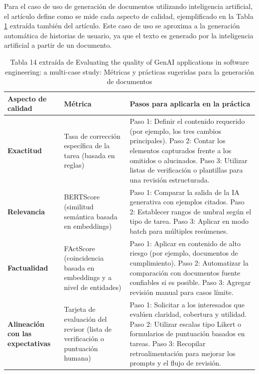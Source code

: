 Para el caso de uso de generación de documentos utilizando inteligencia artificial, el artículo define como se mide cada aspecto de calidad, ejemplificado en la Tabla \ref{table:aritculo-eval2} extraída también del artículo. Este caso de uso se aproxima a la generación automática de historias de usuario, ya que el texto es generado por la inteligencia artificial a partir de un documento.

\begin{longtable}{|p{3cm}| p{4cm} |p{4cm}|}
\caption{Tabla 14 extraída de Evaluating the quality of GenAI applications in software
engineering: a multi-case study: Métricas y prácticas sugeridas para la generación de documentos}
\label{table:aritculo-eval2}\\
\hline
\textbf{Aspecto de calidad} & \textbf{Métrica} & \textbf{Pasos para aplicarla en la práctica} \\
\hline

\textbf{Exactitud} &
Tasa de corrección específica de la tarea (basada en reglas) &
Paso 1: Definir el contenido requerido (por ejemplo, los tres cambios principales). \newline
Paso 2: Contar los elementos capturados frente a los omitidos o alucinados. \newline
Paso 3: Utilizar listas de verificación o plantillas para una revisión estructurada. \\

\hline

\textbf{Relevancia} &
BERTScore (similitud semántica basada en embeddings) &
Paso 1: Comparar la salida de la IA generativa con ejemplos citados. \newline
Paso 2: Establecer rangos de umbral según el tipo de tarea. \newline
Paso 3: Aplicar en modo batch para múltiples resúmenes. \\

\hline

\textbf{Factualidad} &
FActScore (coincidencia basada en embeddings y a nivel de entidades) &
Paso 1: Aplicar en contenido de alto riesgo (por ejemplo, documentos de cumplimiento). \newline
Paso 2: Automatizar la comparación con documentos fuente confiables si es posible. \newline
Paso 3: Agregar revisión manual para casos límite. \\

\hline

\textbf{Alineación con las expectativas} &
Tarjeta de evaluación del revisor (lista de verificación o puntuación humana) &
Paso 1: Solicitar a los interesados que evalúen claridad, cobertura y utilidad. \newline
Paso 2: Utilizar escalas tipo Likert o formularios de puntuación basados en tareas. \newline
Paso 3: Recopilar retroalimentación para mejorar los prompts y el flujo de revisión. \\

\hline
\end{longtable}

